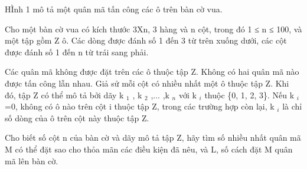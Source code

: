 HÌnh 1 mô tả một quân mã tấn công các ô trên bàn cờ vua.  

   Cho một bàn cờ vua có kích thước 3Xn, 3 hàng và n cột, trong đó 1 ≤ n ≤ 100, và một tập gồm Z ô. Các dòng được đánh số 1 đến 3 từ   trên xuống dưới, các cột được đánh số 1 đến n từ trái sang phải.  

   Các quân mã không được đặt trên các ô thuộc tập Z. Không có hai quân mã nào được tấn công lẫn nhau. Giả sử mỗi cột có nhiều nhất một ô   thuộc tập Z. Khi đó, tập Z có thể mô tả bởi dãy k   $_    1   $   , k   $_    2   $   ,... ,k   $_    n   $   với k   $_    i   $   thuộc \{0, 1, 2, 3\}. Nếu   k   $_    i   $   =0, không có ô nào trên cột i thuộc tập Z, trong các trường hợp còn lại, k   $_    i   $   là chỉ số dòng của ô trên cột này thuộc   tập Z.  

Cho biết số cột n của bàn cờ và dãy mô tả tập Z, hãy tìm số nhiều nhất quân mã M có thể đặt sao cho thỏa mãn các điều kiện đã nêu, và L,   số cách đặt M quân mã lên bàn cờ.